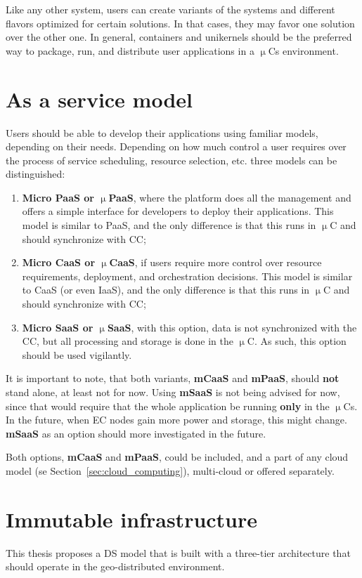 Like any other system, users can create variants of the systems and different flavors optimized for certain solutions. In that cases, they may favor one solution over the other one. In general, containers and unikernels should be the preferred way to package, run, and distribute user applications in a $\upmu$Cs environment.
%
%
\section{As a service model}\label{sec:as_a_service_model}
%
Users should be able to develop their applications using familiar models, depending on their needs. Depending on how much control a user requires over the process of service scheduling, resource selection, etc. three models can be distinguished:
 
\begin{enumerate}[start=1,label={(\bfseries \arabic*)}]
	\item \textbf{Micro PaaS or $\upmu$PaaS}, where the platform does all the management and offers a simple interface for developers to deploy their applications. This model is similar to PaaS, and the only difference is that this runs in $\upmu$C and should synchronize with CC;
	\item \textbf{Micro CaaS or $\upmu$CaaS}, if users require more control over resource requirements, deployment, and orchestration decisions. This model is similar to CaaS (or even IaaS), and the only difference is that this runs in $\upmu$C and should synchronize with CC;
	\item \textbf{Micro SaaS or $\upmu$SaaS}, with this option, data is not synchronized with the CC, but all processing and storage is done in the $\upmu$C. As such, this option should be used vigilantly.
\end{enumerate}

\noindent
It is important to note, that both variants, \textbf{mCaaS} and \textbf{mPaaS}, should \textbf{not} stand alone, at least not for now. Using \textbf{mSaaS} is not being advised for now, since that would require that the whole application be running \textbf{only} in the $\upmu$Cs. In the future, when EC nodes gain more power and storage, this might change. \textbf{mSaaS} as an option should more investigated in the future.

Both options, \textbf{mCaaS} and \textbf{mPaaS}, could be included, and a part of any cloud model (se Section~\ref{sec:cloud_computing}), multi-cloud or offered separately.
%
%
\section{Immutable infrastructure}\label{sec:immutable_infrastructure}
%
This thesis proposes a DS model that is built with a three-tier architecture that should operate in the geo-distributed environment. 

